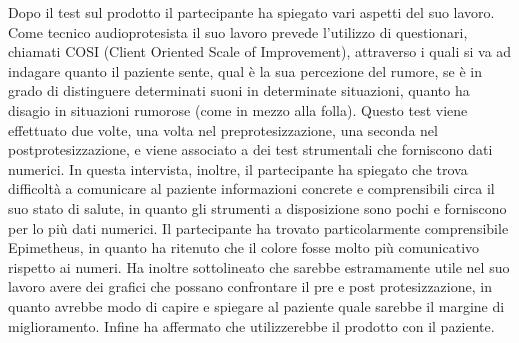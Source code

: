 Dopo il test sul prodotto il partecipante ha spiegato vari aspetti del suo lavoro. Come tecnico audioprotesista il suo lavoro prevede l'utilizzo di questionari, chiamati COSI (Client Oriented Scale of Improvement), attraverso i quali si va ad indagare quanto il paziente sente, qual è la sua percezione del rumore, se è in grado di distinguere determinati suoni in determinate situazioni, quanto ha disagio in situazioni rumorose (come in mezzo alla folla). Questo test viene effettuato due volte, una volta nel preprotesizzazione, una seconda nel postprotesizzazione, e viene associato a dei test strumentali che forniscono dati numerici. In questa intervista, inoltre, il partecipante ha spiegato che trova difficoltà a comunicare al paziente informazioni concrete e comprensibili circa il suo stato di salute, in quanto gli strumenti a disposizione sono pochi e forniscono per lo più dati numerici. Il partecipante ha trovato particolarmente comprensibile Epimetheus, in quanto ha ritenuto che il colore fosse molto più comunicativo rispetto ai numeri. Ha inoltre sottolineato che sarebbe estramamente utile nel suo lavoro avere dei grafici che possano confrontare il pre e post protesizzazione, in quanto avrebbe modo di capire e spiegare al paziente quale sarebbe il margine di miglioramento. Infine ha affermato che utilizzerebbe il prodotto con il paziente. 

